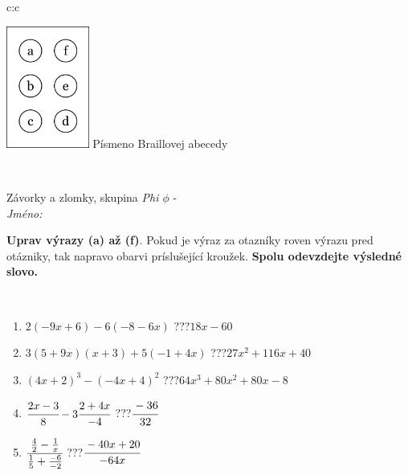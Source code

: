 \documentclass[10pt]{report}
\begin{document}
\begin{tabular}{c:c}
\begin{minipage}[c][104.5mm][t]{0.5\linewidth}
\begin{center}
\begin{minipage}{0.20\linewidth}
\begin{center}
\includegraphics[height=40mm]{../images/braille.png}
{\small Písmeno Braillovej abecedy}
\end{center}
\end{minipage}
\end{center}
\end{minipage}
\\ \hdashline
\begin{minipage}[c][104.5mm][t]{0.5\linewidth}
\begin{center}
\vspace{7mm}
{\huge Závorky a zlomky, skupina \textit{Phi $\phi$} -}\\[5mm]
\textit{Jméno:}\phantom{xxxxxxxxxxxxxxxxxxxxxxxxxxxxxxxxxxxxxxxxxxxxxxxxxxxxxxxxxxxxxxxxx}\\[5mm]
\begin{minipage}{0.95\linewidth}
\begin{center}
\textbf{Uprav výrazy (a) až (f)}. Pokud je výraz za otazníky roven výrazu pred otázniky, tak napravo obarvi príslušející kroužek. \textbf{Spolu odevzdejte výsledné slovo.}
\end{center}
\end{minipage}
\\[1mm]
\begin{minipage}{0.79\linewidth}
\begin{center}
\begin{varwidth}{\linewidth}
\begin{enumerate}
\normalsize
\item $2(-9x+6)-6(-8-6x)$\quad \dotfill\; ???\;\dotfill \quad $18x-60$
\item $3(5+9x)(x+3)+5(-1+4x)$\quad \dotfill\; ???\;\dotfill \quad $27x^2+116x+40$
\item $(4x+2)^3-(-4x+4)^2$\quad \dotfill\; ???\;\dotfill \quad $64x^3+80x^2+80x-8$
\item $\cfrac{2x-3}{8}-3\cfrac{2+4x}{-4}$\quad \dotfill\; ???\;\dotfill \quad $\cfrac{-36}{32}$
\item $\cfrac{\frac{4}{2}-\frac{1}{x}}{\frac{1}{5}+\frac{-6}{-2}}$\quad \dotfill\; ???\;\dotfill \quad $\cfrac{-40x+20}{-64x}$

\end{enumerate}
\end{varwidth}
\end{center}
\end{minipage}
\end{center}
\end{minipage}
\end{tabular}
\end{document}
